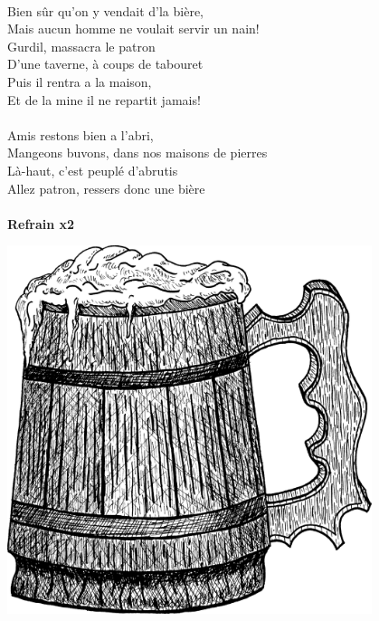 \\Bien sûr qu'on y vendait d'la bière,
\\Mais aucun homme ne voulait servir un nain!
\\Gurdil, massacra le patron
\\D'une taverne, à coups de tabouret
\\Puis il rentra a la maison,
\\Et de la mine il ne repartit jamais!
\\\\Amis restons bien a l'abri,
\\Mangeons buvons, dans nos maisons de pierres
\\Là-haut, c'est peuplé d'abrutis
\\Allez patron, ressers donc une bière
\\\\\textbf{Refrain x2}
\bigskip
\bigskip
\begin{center}
\includegraphics[width=0.8\textwidth]{images/brev65.png}
\end{center}
\breakpage